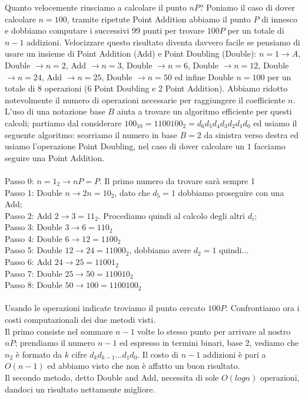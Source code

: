 \documentclass[a4paper,12pt]{tesiinfo}
\begin{document}
Quanto velocemente riusciamo a calcolare il punto $nP$? Poniamo il caso di dover calcolare $n=100$, tramite ripetute Point Addition abbiamo il punto $P$ di innesco e dobbiamo computare i successivi 99 punti per trovare $100P$ per un totale di $n-1$ addizioni. Velocizzare questo risultato diventa davvero facile se pensiamo di usare un insieme di Point Addition (Add) e Point Doubling (Double): $n=1 \to A$, Double $\to n=2$, Add $\to n=3$, Double $\to n=6$, Double $\to n=12$, Double $\to n=24$, Add $\to n=25$, Double $\to n=50$ ed infine Double $n=100$ per un totale di 8 operazioni (6 Point Doubling e 2 Point Addition). Abbiamo ridotto notevolmente il numero di operazioni necessarie per raggiungere il coefficiente $n$. 
\\
L'uso di una notazione base $B$ aiuta a trovare un algoritmo efficiente per questi calcoli; partiamo dal considerare $100_{10} = 1100100_2 = d_6d_5d_4d_3d_2d_1d_0$ ed usiamo il seguente algoritmo: scorriamo il numero in base $B=2$ da sinistra verso destra ed usiamo l'operazione Point Doubling, nel caso di dover calcolare un $1$ facciamo seguire una Point Addition. 
\\
\\
Passo 0: $n=1_2 \to nP = P$. Il primo numero da trovare sar\`a sempre 1\\
Passo 1: Double $n \to 2n = 10_2$, dato che $d_5 = 1$ dobbiamo proseguire con una Add;\\
Passo 2: Add    $2 \to 3 = 11_2$. Procediamo quindi al calcolo degli altri $d_i$;\\
Passo 3: Double $3 \to 6 = 110_2$\\
Passo 4: Double $6 \to 12 = 1100_2$\\
Passo 5: Double $12 \to 24 = 11000_2$, dobbiamo avere $d_2 = 1$ quindi...\\
Passo 6: Add    $24 \to 25 = 11001_2$\\
Passo 7: Double $25 \to 50 = 110010_2$\\
Passo 8: Double $50 \to 100 = 1100100_2$\\
\\
Usando le operazioni indicate troviamo il punto cercato $100P$. Confrontiamo ora i costi computazionali dei due metodi visti. 
\\
Il primo consiste nel sommare $n-1$ volte lo stesso punto per arrivare al nostro $nP$; prendiamo il numero $n-1$ ed espresso in termini binari, base 2, vediamo che $n_2$ \`e formato da $k$ cifre $d_kd_{k-1} \ldots d_1d_0$. Il costo di $n-1$ addizioni \`e pari a $O(n-1)$ ed abbiamo visto che non \`e affatto un buon risultato. 
\\
Il secondo metodo, detto Double and Add, necessita di sole $O(log n)$ operazioni, dandoci un risultato nettamente migliore.
%
%
%
%
\end{document}
